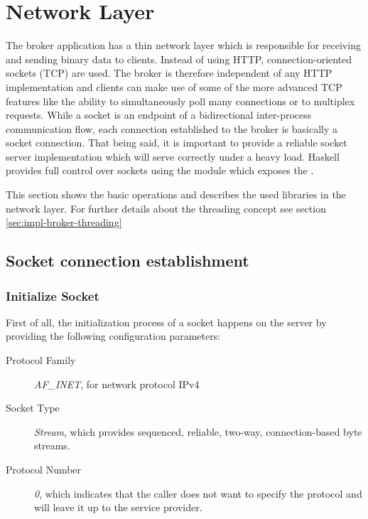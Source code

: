 \section{Network Layer}
\label{sec:broker-network}

The broker application has a thin network layer which is responsible for
receiving and sending binary data to clients. Instead of using HTTP, 
connection-oriented sockets (TCP) are used. The broker is therefore independent
of any HTTP implementation and clients can make use of some of the more advanced
TCP features like the ability to simultaneously poll many connections or to
multiplex requests. While a socket is an endpoint of a bidirectional
inter-process communication flow, each connection established to the broker is
basically a socket connection. That being said, it is important to provide a
reliable socket server implementation which will serve correctly under a heavy
load. Haskell provides full control over sockets using the
module which exposes the .

This section shows the basic operations and describes the used libraries in the
network layer. For further details about the threading concept see section
\ref{sec:impl-broker-threading} 

\subsection{Socket connection establishment}
\label{sec:impl-broker-socket-connection}


\subsubsection{Initialize Socket}

First of all, the initialization process of a socket happens on the server by providing the following configuration parameters:
\begin{description}
  \item[Protocol Family] \textit{AF\_INET}, for network protocol IPv4
  \item[Socket Type] \textit{Stream}, which provides sequenced, reliable, two-way, connection-based byte streams.
  \item[Protocol Number] \textit{0}, which indicates that the caller does not want to specify the protocol and will leave it up to the service provider.
\end{description}

